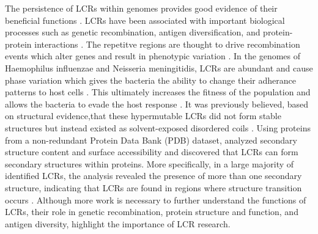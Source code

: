 \documentclass{article}
\begin{document}
The persistence of LCRs within genomes provides good evidence of their beneficial functions \cite{verstrepen2005intragenic}.
LCRs have been associated with important biological processes such as genetic recombination, antigen diversification, and
protein-protein interactions \citep{karlin2002amino, verstrepen2005intragenic, kumari2015low}. The repetitve regions are thought
to drive recombination events which alter genes and result in phenotypic variation \citep{verstrepen2005intragenic}. In the genomes of
Haemophilus influenzae and Neisseria meningitidis, LCRs are abundant and cause phase variation which gives the bacteria the
ability to change their adherance patterns to host cells \citep{bayliss2001simple}. This ultimately increases the fitness of the population and allows the bacteria to evade the host response \citep{bayliss2001simple}. It was previously believed, based on structural evidence,that these hypermutable LCRs did not form stable structures but instead existed as solvent-exposed disordered coils \citep{wootton1993statistics, huntley2002simple, depristo2006abundance}. Using proteins from a non-redundant Protein Data Bank (PDB) dataset, \citet{kumari2015low} analyzed secondary structure content and surface accessibility and discovered that LCRs
can form secondary structures within proteins. More specifically, in a large majority of identified LCRs, the analysis revealed
the presence of more than one secondary structure, indicating that LCRs are found in regions where structure transition occurs
\citep{kumari2015low}. Although more work is necessary to further understand the functions of LCRs, their role in genetic
recombination, protein structure and function, and antigen diversity, highlight the importance of LCR research.
\end{document}
